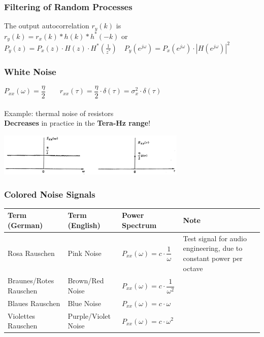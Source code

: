 		\subsubsection{Filtering of Random Processes}
		The output autocorrelation $r_y(k)$ is\\
		 $r_y(k) = r_x(k)\ast h(k) \ast h^*(-k)$ or $\boxed{P_{y}(z) = P_{x}(z)\cdot H(z) \cdot H^*(\frac{1}{z^*}) \quad
		  P_{y}(e^{j\omega})=P_x(e^{j\omega})\cdot|H(e^{j\omega})|^2}$

		\subsubsection{White Noise}
		\begin{center}
			\begin{minipage}{8cm}
				$P_{xx}(\omega) = \dfrac{\eta}{2} \qquad r_{xx}(\tau) = \dfrac{\eta}{2} \cdot \delta(\tau)= \sigma_x^2 \cdot \delta(\tau)$ \\ \\
				Example: thermal noise of resistors \\
				\textbf{Decreases} in practice in the \textbf{Tera-Hz range}!
			\end{minipage}
			\begin{minipage}{10cm}
				\includegraphics[width=9cm]{bilder/weisses_rauschen.png}
			\end{minipage}
		\end{center}


		\subsubsection{Colored Noise Signals}
		\renewcommand{\arraystretch}{2}
		\begin{tabular}[c]{ | p{4cm} | p{3.5cm} | p{3cm} | p{6cm} | }
			\hline
				\textbf{Term (German)}
				& \textbf{Term (English)}
				& \textbf{Power Spectrum}
				& \textbf{Note} \\
			\hline
				Rosa Rauschen
				& Pink Noise
				& $P_{xx}(\omega) = c \cdot \dfrac{1}{\omega}$
				& Test signal for audio engineering, due to constant power per octave \\
			\hline
				Braunes/Rotes Rauschen
				& Brown/Red Noise
				&   $P_{xx}(\omega) = c \cdot \dfrac{1}{\omega^2}$
				& \\
			\hline
				Blaues Rauschen
				& Blue Noise
				&   $P_{xx}(\omega) = c \cdot \omega$
				& \\
			\hline
				Violettes Rauschen
				& Purple/Violet Noise
				&   $P_{xx}(\omega) = c \cdot \omega^2$
				& \\
			\hline
		\end{tabular}
		\renewcommand{\arraystretch}{1}



